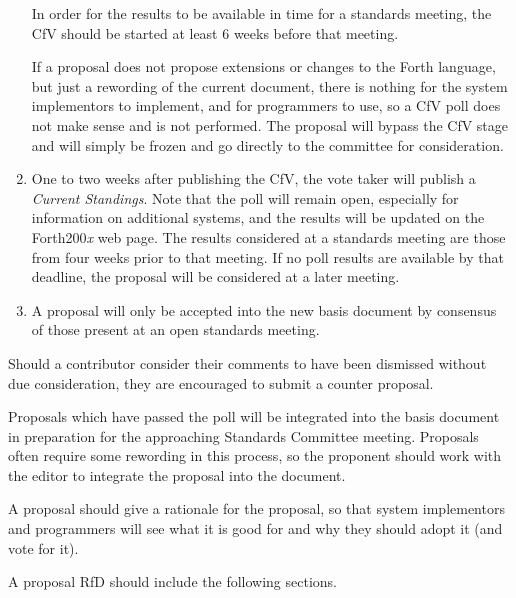 \begin{enumerate}
	In order for the results to be available in time for a standards
	meeting, the CfV should be started at least 6 weeks before that
	meeting.

	If a proposal does not propose extensions or changes to the Forth
	language, but just a rewording of the current document, there is
	nothing for the system implementors to implement, and for
	programmers to use, so a CfV poll does not make sense and is not
	performed.  The proposal will bypass the CfV stage and will simply
	be frozen and go directly to the committee for consideration.

\item
	One to two weeks after publishing the CfV, the vote taker will
	publish a \emph{Current Standings}.  Note that the poll will remain
	open, especially for information on additional systems, and the
	results will be updated on the Forth200\emph{x} web page.  The
	results considered at a standards meeting are those from four weeks
	prior to that meeting.  If no poll results are available by that
	deadline, the proposal will be considered at a later meeting.

\item
	A proposal will only be accepted into the new basis document by
	consensus of those present at an open standards meeting.
\end{enumerate}

Should a contributor consider their comments to have been dismissed
without due consideration, they are encouraged to submit a counter
proposal.

Proposals which have passed the poll will be integrated into the basis
document in preparation for the approaching Standards Committee meeting.
Proposals often require some rewording in this process, so the proponent
should work with the editor to integrate the proposal into the document.

A proposal should give a rationale for the proposal, so that system
implementors and programmers will see what it is good for and why they
should adopt it (and vote for it).

A proposal RfD should include the following sections.

